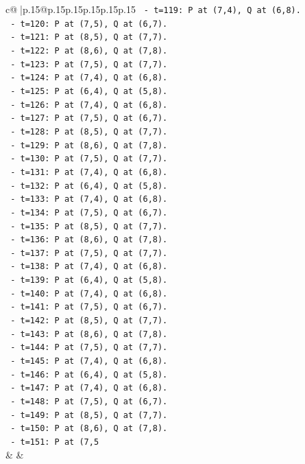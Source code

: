 \documentclass{article}
\begin{document}
{\begin{supertabular}{c@{$\;$}|p{.15\linewidth}@{}p{.15\linewidth}p{.15\linewidth}p{.15\linewidth}p{.15\linewidth}p{.15\linewidth}}
{{{\texttt{      {-} t=119: P at (7,4), Q at (6,8).} \\
\texttt{      {-} t=120: P at (7,5), Q at (6,7).} \\
\texttt{      {-} t=121: P at (8,5), Q at (7,7).} \\
\texttt{      {-} t=122: P at (8,6), Q at (7,8).} \\
\texttt{      {-} t=123: P at (7,5), Q at (7,7).} \\
\texttt{      {-} t=124: P at (7,4), Q at (6,8).} \\
\texttt{      {-} t=125: P at (6,4), Q at (5,8).} \\
\texttt{      {-} t=126: P at (7,4), Q at (6,8).} \\
\texttt{      {-} t=127: P at (7,5), Q at (6,7).} \\
\texttt{      {-} t=128: P at (8,5), Q at (7,7).} \\
\texttt{      {-} t=129: P at (8,6), Q at (7,8).} \\
\texttt{      {-} t=130: P at (7,5), Q at (7,7).} \\
\texttt{      {-} t=131: P at (7,4), Q at (6,8).} \\
\texttt{      {-} t=132: P at (6,4), Q at (5,8).} \\
\texttt{      {-} t=133: P at (7,4), Q at (6,8).} \\
\texttt{      {-} t=134: P at (7,5), Q at (6,7).} \\
\texttt{      {-} t=135: P at (8,5), Q at (7,7).} \\
\texttt{      {-} t=136: P at (8,6), Q at (7,8).} \\
\texttt{      {-} t=137: P at (7,5), Q at (7,7).} \\
\texttt{      {-} t=138: P at (7,4), Q at (6,8).} \\
\texttt{      {-} t=139: P at (6,4), Q at (5,8).} \\
\texttt{      {-} t=140: P at (7,4), Q at (6,8).} \\
\texttt{      {-} t=141: P at (7,5), Q at (6,7).} \\
\texttt{      {-} t=142: P at (8,5), Q at (7,7).} \\
\texttt{      {-} t=143: P at (8,6), Q at (7,8).} \\
\texttt{      {-} t=144: P at (7,5), Q at (7,7).} \\
\texttt{      {-} t=145: P at (7,4), Q at (6,8).} \\
\texttt{      {-} t=146: P at (6,4), Q at (5,8).} \\
\texttt{      {-} t=147: P at (7,4), Q at (6,8).} \\
\texttt{      {-} t=148: P at (7,5), Q at (6,7).} \\
\texttt{      {-} t=149: P at (8,5), Q at (7,7).} \\
\texttt{      {-} t=150: P at (8,6), Q at (7,8).} \\
\texttt{      {-} t=151: P at (7,5} \\
            }
        }
    }
    & & \\ \\


\end{supertabular}}
\end{document}
